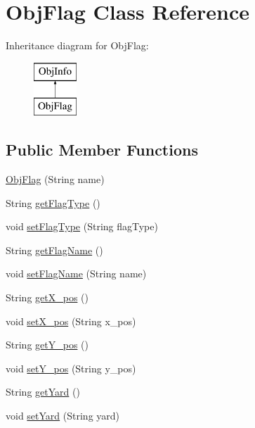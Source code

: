 \hypertarget{classObjFlag}{
\section{ObjFlag Class Reference}
\label{classObjFlag}
}
Inheritance diagram for ObjFlag:\begin{figure}[H]
\begin{center}
\leavevmode
\includegraphics[height=2.000000cm]{classObjFlag}
\end{center}
\end{figure}
\subsection*{Public Member Functions}
\begin{DoxyCompactItemize}
\item 
\hyperlink{classObjFlag_a0fe2e7f04dc85a25f9975fa6e2d498e8}{ObjFlag} (String name)
\item 
String \hyperlink{classObjFlag_abafa787ef25f5a2367ae8cc37d603edb}{getFlagType} ()
\item 
void \hyperlink{classObjFlag_ae146d3a1a32eb06e0de706cb2615b736}{setFlagType} (String flagType)
\item 
String \hyperlink{classObjFlag_a05a03e912304e928e93281cbdd53c7f3}{getFlagName} ()
\item 
void \hyperlink{classObjFlag_a0cf54867f58671b491cf79a3710760c5}{setFlagName} (String name)
\item 
String \hyperlink{classObjFlag_aabcf15537dc016e0be306cf1470cee9f}{getX\_\-pos} ()
\item 
void \hyperlink{classObjFlag_aa9f908a777bc2f8a08adff6d2b622c1e}{setX\_\-pos} (String x\_\-pos)
\item 
String \hyperlink{classObjFlag_ab49184dc2174d2885dedd7e67524e69b}{getY\_\-pos} ()
\item 
void \hyperlink{classObjFlag_af1de8db60b153f2094d0a8dfd4b5d556}{setY\_\-pos} (String y\_\-pos)
\item 
String \hyperlink{classObjFlag_a5e4953a0645da52e419791223a3f44ef}{getYard} ()
\item 
void \hyperlink{classObjFlag_a8632cc6f057c18f45926eab53ca1dc48}{setYard} (String yard)
\end{DoxyCompactItemize}


